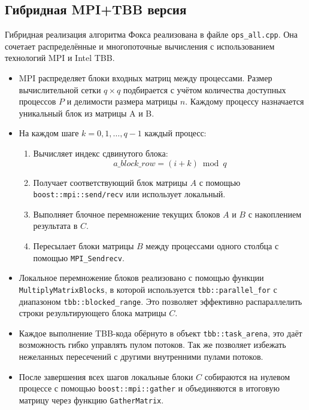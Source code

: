 \documentclass[12pt,a4paper]{extarticle}
\begin{document}
\subsection*{Гибридная MPI+TBB версия}
Гибридная реализация алгоритма Фокса реализована в файле \texttt{ops\_all.cpp}.
Она сочетает распределённые и многопоточные вычисления с использованием технологий MPI и Intel TBB.

\begin{itemize}
	\item MPI распределяет блоки входных матриц между процессами.  
	Размер вычислительной сетки \( q \times q \) подбирается с учётом количества доступных процессов \( P \) и делимости размера матрицы \( n \).  
	Каждому процессу назначается уникальный блок из матрицы A и B.
	
	\item На каждом шаге \( k = 0, 1, \dots, q-1 \) каждый процесс:
	\begin{enumerate}
		\item Вычисляет индекс сдвинутого блока:
		\[
		a\_block\_row = (i + k) \bmod q
		\]
		\item Получает соответствующий блок матрицы \( A \) с помощью \texttt{boost::mpi::send/recv} или использует локальный.
		\item Выполняет блочное перемножение текущих блоков \( A \) и \( B \) с накоплением результата в \( C \).
		\item Пересылает блоки матрицы \( B \) между процессами одного столбца с помощью \texttt{MPI\_Sendrecv}.
	\end{enumerate}
	
	\item Локальное перемножение блоков реализовано с помощью функции \texttt{MultiplyMatrixBlocks},  
	в которой используется \texttt{tbb::parallel\_for} с диапазоном \texttt{tbb::blocked\_range}.  
	Это позволяет эффективно распараллелить строки результирующего блока матрицы \( C \).
	
	\item Каждое выполнение TBB-кода обёрнуто в объект \texttt{tbb::task\_arena}, это даёт возможность гибко управлять пулом потоков.  
	Так же позволяет избежать нежеланных пересечений с другими внутренними пулами потоков.
	
	\item После завершения всех шагов локальные блоки \( C \) собираются на нулевом процессе с помощью  
	\texttt{boost::mpi::gather} и объединяются в итоговую матрицу через функцию \texttt{GatherMatrix}.
\end{itemize}
\end{document}
